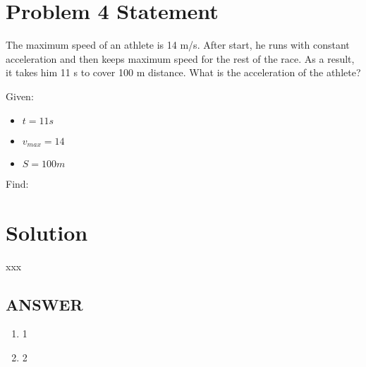 \section*{Problem 4 Statement}

The maximum speed of an athlete is 14 m/s. After start, he runs with constant acceleration and
then keeps maximum speed for the rest of the race. As a result, it takes him 11 s to cover 100 m
distance. What is the acceleration of the athlete?

\bigbreak Given:

\begin{itemize}
    \item $t = 11s$
    \item $v_{max} = 14$
    \item $S = 100m$
\end{itemize}

\bigbreak Find:


\section*{Solution}

xxx

\vfill
\subsection*{ANSWER}
\begin{enumerate}
    \item 1
    \item 2
\end{enumerate}